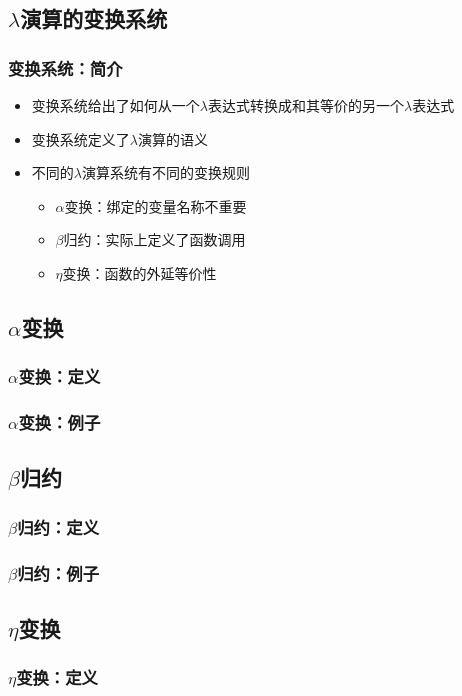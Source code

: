 \documentclass[CJKutf8,compress,hyperref]{beamer}
\begin{document}
\begin{CJK}{UTF8}{song}
\section{$\lambda$演算的变换系统}
\begin{frame}
  \frametitle{变换系统：简介} 
  \begin{itemize}
  \item 变换系统给出了如何从一个$\lambda$表达式转换成和其等价的另一个$\lambda$表达式
  \item 变换系统定义了$\lambda$演算的语义
  \item 不同的$\lambda$演算系统有不同的变换规则
    \begin{itemize}
    \item $\alpha$变换：绑定的变量名称不重要
    \item $\beta$归约：实际上定义了函数调用 
    \item $\eta$变换：函数的外延等价性
    \end{itemize}
  \end{itemize}
\end{frame}

\subsection{$\alpha$变换}
\begin{frame}
    \frametitle{$\alpha$变换：定义} 
\end{frame} 

\begin{frame}
    \frametitle{$\alpha$变换：例子} 
\end{frame} 

\subsection{$\beta$归约}
\begin{frame}
    \frametitle{$\beta$归约：定义} 
\end{frame} 

\begin{frame}
    \frametitle{$\beta$归约：例子} 
\end{frame} 

\subsection{$\eta$变换}
\begin{frame}
    \frametitle{$\eta$变换：定义} 
\end{frame} 


\end{CJK}
\end{document}
